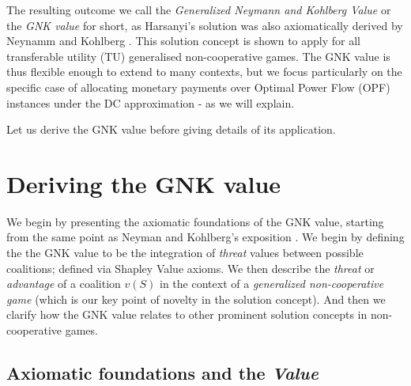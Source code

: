 The resulting outcome we call the \textit{Generalized Neymann and Kohlberg Value} or the \textit{GNK value} for short, 
as Harsanyi's solution was also axiomatically derived by Neynamm and Kohlberg \cite{value2,KOHLBERG2018139}.
This solution concept is shown to apply for all transferable utility (TU) generalised non-cooperative games.
The GNK value is thus flexible enough to extend to many contexts, but we focus particularly on the specific case of allocating monetary payments over Optimal Power Flow (OPF) instances under the DC approximation - as we will explain.

Let us derive the GNK value before giving details of its application.

\section{Deriving the GNK value}\label{the_value_def2}

We begin by presenting the axiomatic foundations of the GNK value, starting from the same point as Neyman and Kohlberg's exposition \cite{value2}.
We begin by defining the the GNK value to be the integration of \emph{threat} values between possible coalitions; defined via Shapley Value axioms.
We then describe the \emph{threat} or \emph{advantage} of a coalition $v(S)$ in the context of a \textit{generalized non-cooperative game} (which is our key point of novelty in the solution concept).
And then we clarify how the GNK value relates to other prominent solution concepts in non-cooperative games.

\subsection{Axiomatic foundations and the \textit{Value}}\label{the_value_def}


